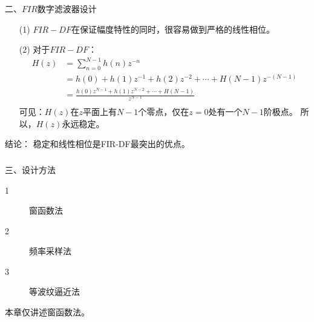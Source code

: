 \documentclass[notheorems,compress,mathserif,table]{beamer}
\begin{document}
\begin{frame}\frametitle{}%
{\heiti 二、$FIR$数字滤波器设计}

  \begin{enumerate}
    \item [(1)]
        $FIR-DF$在保证幅度特性的同时，很容易做到严格的线性相位。

    \item [(2)]
        对于$FIR-DF$：
        \begin{equation*}
            \begin{split}
            H(z) &=\sum_{n=0}^{N-1}h(n)z^{-n}\\
                 &= h(0) + h(1)z^{-1} + h(2)z^{-2} +\cdots + H(N-1)z^{-(N-1)}\\
                 &= \frac{h(0)z^{N-1} + h(1)z^{N-2} +\cdots + H(N-1)}{z^{N-1}}\\
            \end{split}
        \end{equation*}
        可见：$H(z)$在$z$平面上有$N-1$个零点，仅在$z=0$处有一个$N-1$阶极点。
        所以，$H(z)$永远稳定。
  \end{enumerate}

  {\heiti 结论：} {\heiti 稳定}和{\heiti 线性相位}是FIR-DF最突出的优点。

\end{frame}



\begin{frame}\frametitle{}%
{\heiti 三、设计方法}

\begin{description}
  \item[1] 窗函数法
  \item[2] 频率采样法
  \item[3] 等波纹逼近法
\end{description}


    本章仅讲述窗函数法。
\end{frame}
\end{document}
